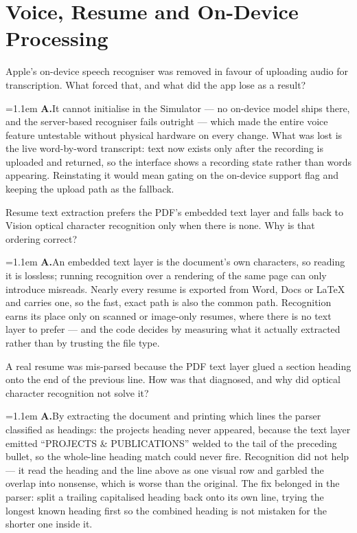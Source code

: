 \documentclass[11pt,a4paper]{article}
\newcommand{\ans}[1]{%
  \par\vspace{0.32em}%
  \begingroup
  \small\color{answerink}%
  \leftskip=1.1em
  \noindent\textbf{\color{accent}A.}\hspace{0.45em}#1\par
  \endgroup
  \vspace{0.1em}%
}
\begin{document}
\section{Voice, Resume and On-Device Processing}
\begin{questions}[resume]

\item Apple's on-device speech recogniser was removed in favour of uploading audio
for transcription. What forced that, and what did the app lose as a result?
\ans{It cannot initialise in the Simulator --- no on-device model ships there, and
the server-based recogniser fails outright --- which made the entire voice feature
untestable without physical hardware on every change. What was lost is the live
word-by-word transcript: text now exists only after the recording is uploaded and
returned, so the interface shows a recording state rather than words appearing.
Reinstating it would mean gating on the on-device support flag and keeping the
upload path as the fallback.}

\item Resume text extraction prefers the PDF's embedded text layer and falls back
to Vision optical character recognition only when there is none. Why is that
ordering correct?
\ans{An embedded text layer is the document's own characters, so reading it is
lossless; running recognition over a rendering of the same page can only
introduce misreads. Nearly every resume is exported from Word, Docs or LaTeX and
carries one, so the fast, exact path is also the common path. Recognition earns
its place only on scanned or image-only resumes, where there is no text layer to
prefer --- and the code decides by measuring what it actually extracted rather
than by trusting the file type.}

\item A real resume was mis-parsed because the PDF text layer glued a section
heading onto the end of the previous line. How was that diagnosed, and why did
optical character recognition not solve it?
\ans{By extracting the document and printing which lines the parser classified as
headings: the projects heading never appeared, because the text layer emitted
``PROJECTS \& PUBLICATIONS'' welded to the tail of the preceding bullet, so the
whole-line heading match could never fire. Recognition did not help --- it read
the heading and the line above as one visual row and garbled the overlap into
nonsense, which is worse than the original. The fix belonged in the parser:
split a trailing capitalised heading back onto its own line, trying the longest
known heading first so the combined heading is not mistaken for the shorter one
inside it.}


\end{questions}
\end{document}
